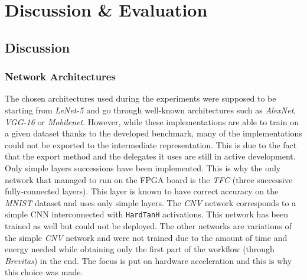 \chapter{Discussion \& Evaluation} %

\label{Chapter8} %



\section{Discussion}


\subsection{Network Architectures}

The chosen architectures used during the experiments were supposed to be starting from \emph{LeNet-5} and go through well-known architectures such as \emph{AlexNet}, \emph{VGG-16} or \emph{Mobilenet}. However, while these implementations are able to train on a given dataset thanks to the developed benchmark, many of the implementations could not be exported to the intermediate representation. This is due to the fact that the export method and the delegates it uses are still in active development. Only simple layers successions have been implemented. This is why the only network that managed to run on the FPGA board is the \emph{TFC} (three successive fully-connected layers). This layer is known to have correct accuracy on the \emph{MNIST} dataset and uses only simple layers. The \emph{CNV} network corresponds to a simple CNN interconnected with \texttt{HardTanH} activations. This network has been trained as well but could not be deployed. The other networks are variations of the simple \emph{CNV} network and were not trained due to the amount of time and energy needed while obtaining only the first part of the workflow (through \emph{Brevitas}) in the end. The focus is put on hardware acceleration and this is why this choice was made.

